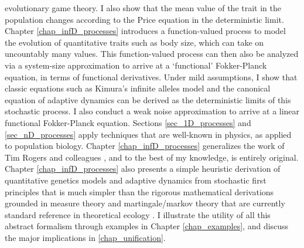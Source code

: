 evolutionary game theory. I also show that the mean value of the trait in the population changes according to the Price equation in the deterministic limit. Chapter \ref{chap_infD_processes} introduces a function-valued process to model the evolution of quantitative traits such as body size, which can take on uncountably many values. This function-valued process can then also be analyzed via a system-size approximation to arrive at a `functional' Fokker-Planck equation, in terms of functional derivatives. Under mild assumptions, I show that classic equations such as Kimura's infinite alleles model and the canonical equation of adaptive dynamics can be derived as the deterministic limits of this stochastic process. I also conduct a weak noise approximation to arrive at a linear functional Fokker-Planck equation.  Sections \ref{sec_1D_processes} and \ref{sec_nD_processes} apply techniques that are well-known in physics, as applied to population biology. Chapter \ref{chap_infD_processes} generalizes the work of Tim Rogers and colleagues \citep{rogers_demographic_2012,rogers_spontaneous_2012,rogers_modes_2015}, and to the best of my knowledge, is entirely original. Chapter \ref{chap_infD_processes} also presents a simple heuristic derivation of quantitative genetics models and adaptive dynamics from stochastic first principles that is much simpler than the rigorous mathematical derivations grounded in measure theory and martingale/markov theory that are currently standard reference in theoretical ecology \citep{champagnat_individual_2008}. I illustrate the utility of all this abstract formalism through examples in Chapter \ref{chap_examples}, and discuss the major implications in \ref{chap_unification}.

